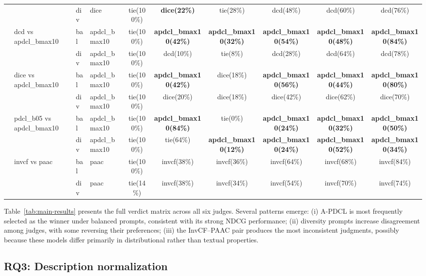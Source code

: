 \documentclass[pdflatex,sn-basic,referee,lineno]{sn-jnl}
\begin{document}
\begin{table}[htbp]
{\begin{tabular}{llllcccccc}
 &  & div & dice & tie(100\%) & \textbf{dice(22\%)} & tie(28\%) & dcd(48\%) & dcd(60\%) & dcd(76\%) \\
 & dcd vs apdcl\_bmax10 & bal & apdcl\_bmax10 & tie(100\%) & \textbf{apdcl\_bmax10(42\%)} & \textbf{apdcl\_bmax10(32\%)} & \textbf{apdcl\_bmax10(54\%)} & \textbf{apdcl\_bmax10(48\%)} & \textbf{apdcl\_bmax10(84\%)} \\
 &  & div & apdcl\_bmax10 & tie(100\%) & dcd(10\%) & tie(8\%) & dcd(28\%) & dcd(64\%) & dcd(78\%) \\
 & dice vs apdcl\_bmax10 & bal & apdcl\_bmax10 & tie(100\%) & \textbf{apdcl\_bmax10(42\%)} & dice(18\%) & \textbf{apdcl\_bmax10(56\%)} & \textbf{apdcl\_bmax10(44\%)} & \textbf{apdcl\_bmax10(80\%)} \\
 &  & div & apdcl\_bmax10 & tie(100\%) & dice(20\%) & dice(18\%) & dice(42\%) & dice(62\%) & dice(70\%) \\
 & pdcl\_b05 vs apdcl\_bmax10 & bal & apdcl\_bmax10 & tie(100\%) & \textbf{apdcl\_bmax10(84\%)} & tie(0\%) & \textbf{apdcl\_bmax10(24\%)} & \textbf{apdcl\_bmax10(32\%)} & \textbf{apdcl\_bmax10(50\%)} \\
 &  & div & apdcl\_bmax10 & tie(100\%) & tie(64\%) & \textbf{apdcl\_bmax10(12\%)} & \textbf{apdcl\_bmax10(24\%)} & \textbf{apdcl\_bmax10(52\%)} & \textbf{apdcl\_bmax10(34\%)} \\
 & invcf vs paac & bal & paac & tie(100\%) & invcf(38\%) & invcf(36\%) & invcf(64\%) & invcf(68\%) & invcf(84\%) \\
 &  & div & paac & tie(14\%) & invcf(38\%) & invcf(34\%) & invcf(54\%) & invcf(70\%) & invcf(74\%) \\
\hline
\end{tabular}%
}
\end{table}

Table~\ref{tab:main-results} presents the full verdict matrix across all six judges. Several patterns emerge: (i) A-PDCL is most frequently selected as the winner under balanced prompts, consistent with its strong NDCG performance; (ii) diversity prompts increase disagreement among judges, with some reversing their preferences; (iii) the InvCF--PAAC pair produces the most inconsistent judgments, possibly because these models differ primarily in distributional rather than textual properties.

\subsection{RQ3: Description normalization}
\end{document}
